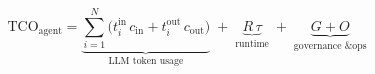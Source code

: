 \begin{equation}
\label{eq:tco}
\mathrm{TCO}_{\text{agent}}
= \underbrace{\sum_{i=1}^{N}\!\big( t^{\text{in}}_{i}\,c_{\text{in}} + t^{\text{out}}_{i}\,c_{\text{out}} \big)}_{\text{LLM token usage}}
\;+\; \underbrace{R\,\tau}_{\text{runtime}}
\;+\; \underbrace{G + O}_{\text{governance \& ops}}
\end{equation}
